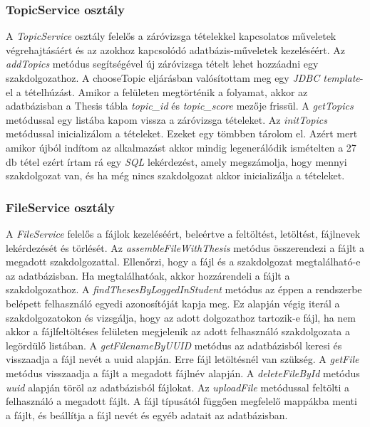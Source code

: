 \subsubsection{TopicService osztály}

A \textit{TopicService} osztály felelős a záróvizsga tételekkel kapcsolatos műveletek végrehajtásáért és az azokhoz kapcsolódó adatbázis-műveletek kezeléséért. Az \textit{addTopics} metódus segítségével új záróvizsga tételt lehet hozzáadni egy szakdolgozathoz. A chooseTopic eljárásban valósítottam meg egy \textit{JDBC template}-el \cite{JdbcTemplate} a tételhúzást. Amikor a felületen megtörténik a folyamat, akkor az adatbázisban a Thesis tábla \textit{topic\_id} és \textit{topic\_score} mezője frissül. A \textit{getTopics} metódussal egy listába kapom vissza a záróvizsga tételeket. Az \textit{initTopics} metódussal inicializálom a tételeket. Ezeket egy tömbben tárolom el. Azért mert amikor újból indítom az alkalmazást akkor mindig legenerálódik ismételten a 27 db tétel ezért írtam rá egy \textit{SQL} \cite{SQL} lekérdezést, amely megszámolja, hogy mennyi szakdolgozat van, és ha még nincs szakdolgozat akkor inicializálja a tételeket.

\subsubsection{FileService osztály}

A \textit{FileService} felelős a fájlok kezeléséért, beleértve a feltöltést, letöltést, fájlnevek lekérdezését és törlését. Az \textit{assembleFileWithThesis} metódus összerendezi a fájlt a megadott szakdolgozattal. Ellenőrzi, hogy a fájl és a szakdolgozat megtalálható-e az adatbázisban. Ha megtalálhatóak, akkor hozzárendeli a fájlt a szakdolgozathoz. A \textit{findThesesByLoggedInStudent} metódus az éppen a rendszerbe belépett felhasználó egyedi azonosítóját kapja meg. Ez alapján végig iterál a szakdolgozatokon és vizsgálja, hogy az adott dolgozathoz tartozik-e fájl, ha nem akkor a fájlfeltöltéses felületen megjelenik az adott felhasználó szakdolgozata a legördülő listában. A \textit{getFilenameByUUID} metódus az adatbázisból keresi és visszaadja a fájl nevét a uuid alapján. Erre fájl letöltésnél van szükség. A \textit{getFile} metódus visszaadja a fájlt a megadott fájlnév alapján. A \textit{deleteFileById} metódus \textit{uuid} alapján töröl az adatbázisból fájlokat. Az \textit{uploadFile} metódussal feltölti a felhasználó a megadott fájlt. A fájl típusától függően megfelelő mappákba menti a fájlt, és beállítja a fájl nevét és egyéb adatait az adatbázisban.

